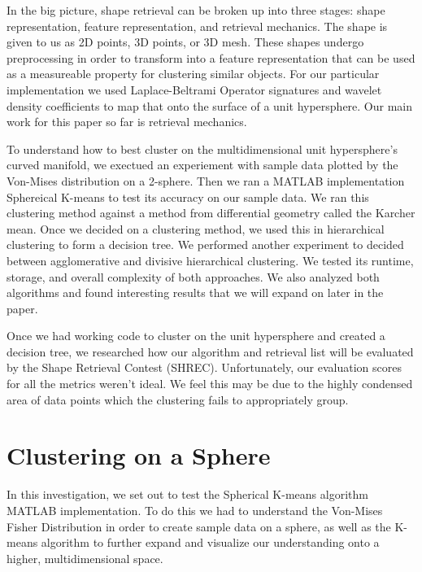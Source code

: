 \documentclass{article}
\begin{document}
In the big picture, shape retrieval can be broken up into three stages:
shape representation, feature representation, and retrieval mechanics. The shape is given to us as 2D points, 3D points, or 3D mesh. These shapes undergo preprocessing in order to transform into a feature representation that can be used as a measureable property for clustering similar objects. For our particular implementation we used Laplace-Beltrami Operator signatures and wavelet density coefficients to map that onto the surface of a unit hypersphere. Our main work for this paper so far is retrieval mechanics.

To understand how to best cluster on the multidimensional unit hypersphere's curved manifold, we exectued an experiement with sample data plotted by the Von-Mises distribution on a 2-sphere. Then we ran a MATLAB implementation Sphereical K-means to test its accuracy on our sample data. We ran this clustering method against a method from differential geometry called the Karcher mean. Once we decided on a clustering method, we used this in hierarchical clustering to form a decision tree. We performed another experiment to decided between agglomerative and divisive hierarchical clustering. We tested its runtime, storage, and overall complexity of both approaches. We also analyzed both algorithms and found interesting results that we will expand on later in the paper.

Once we had working code to cluster on the unit hypersphere and
created a decision tree, we researched how our algorithm and retrieval list will be evaluated by the Shape Retrieval Contest (SHREC). Unfortunately, our evaluation scores for all the metrics weren't ideal. We feel this may be due to the highly condensed area of data points which the clustering fails to appropriately group.

\part*{Clustering on a Sphere}
In this investigation, we set out to test the Spherical K-means algorithm MATLAB implementation. To do this we had to understand the Von-Mises Fisher Distribution in order to create sample data on a sphere, as well as the K-means algorithm to further expand and visualize our understanding onto a higher, multidimensional space.









\newpage


\end{document}
